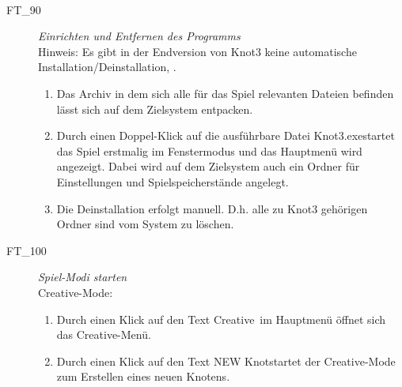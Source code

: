 \begin{description}
\begin{itemize}
        ~\\
		
		\end{itemize}
		
		

\label{FT:90}

	\item[FT\_90] \textit{Einrichten und Entfernen des Programms} \hfill\\

	Hinweis: Es gibt in der Endversion von Knot3 keine automatische Installation/Deinstallation, \hyperref[]{}.\\
		
	\begin{enumerate}

		\item Das Archiv in dem sich alle für das Spiel relevanten Dateien befinden lässt sich auf dem Zielsystem entpacken.
		
		\item Durch einen Doppel-Klick auf die ausführbare Datei \glqq Knot3.exe\grqq startet das Spiel erstmalig im Fenstermodus und das Hauptmenü wird angezeigt. Dabei wird auf dem Zielsystem auch ein Ordner für Einstellungen und Spielspeicherstände angelegt.
		
		\item Die Deinstallation erfolgt manuell. D.h. alle zu Knot3 gehörigen Ordner sind vom System zu löschen.
		~\\ 
	
	\end{enumerate}
	
	

\label{FT:100}
	
	\item[FT\_100] \textit{Spiel-Modi starten} \hfill\\
	
	Creative-Mode:\\
	
	\begin{enumerate}
	
		\item Durch einen Klick auf den Text \glqq Creative\grqq~im Hauptmenü öffnet sich das Creative-Menü.
		
		\item Durch einen Klick auf den Text \glqq NEW Knot\glqq startet der Creative-Mode zum Erstellen eines neuen Knotens.
		

\end{enumerate}
\end{description}
